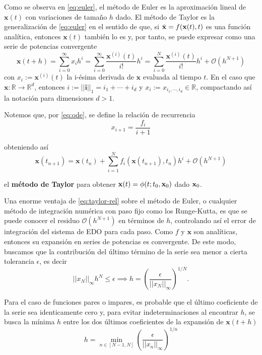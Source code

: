 Como se observa en \ref{eq:euler}, el método de Euler es la aproximación lineal de $\mathbf{x}(t)$ con variaciones de tamaño $h$ dado. El método de Taylor es la generalización de \ref{eq:euler} en el sentido de que, si $\dot{\mathbf{x}} = f(\mathbf{x}(t),t)$ es una función analítica, entonces $\mathbf{x}(t)$ también lo es y, por tanto, se puede expresar como una serie de potencias convergente 
\begin{equation}
\mathbf{x}(t + h) = \sum_{i=0}^\infty x_i h^i = \sum_{i=0}^\infty \frac{\mathbf{x}^{(i)}(t)}{i!}h^i 
= \sum_{i=0}^N \frac{\mathbf{x}^{(i)}(t)}{i!}h^i + \mathcal{O}(h^{N+1})
\label{eq:anal-exp}
\end{equation}
con $x_i := \mathbf{x}^{(i)}(t)$ la i-ésima derivada de $\mathbf{x}$ evaluada al tiempo $t$. En el caso que $\mathbf{x}: \mathbb{R} \to \mathbb{R}^d$, entonces $i := ||\mathbf{i}||_1 = i_1 + \cdots + i_d$ y $x_i := x_{i_1,\cdots,i_d} \in \mathbb{R}$, compactando así la notación para dimensiones $d > 1$.

Notemos que, por \ref{eq:ode}, se define la relación de recurrencia
\begin{equation}
x_{i+1} = \frac{f_i}{i+1}
\label{eq:rec-rel}
\end{equation}

obteniendo así 
\begin{equation}
\mathbf{x}(t_{n+1}) = \mathbf{x}(t_n) + \sum_{i=1}^N f_i(\mathbf{x}(t_{n+1}),t_n)h^i + \mathcal{O}(h^{N+1})
\label{eq:taylor-rel}
\end{equation}

el \textbf{método de Taylor} para obtener $\mathbf{x}(t) = \phi(t;t_0,\mathbf{x}_0)$ dado $\mathbf{x}_0$.

Una enorme ventaja de \ref{eq:taylor-rel} sobre el método de Euler, o cualquier método de integración numérica con paso fijo como los Runge-Kutta, es que se puede conocer el residuo $\mathcal{O}(h^{N+1})$ en términos de $h$, controlando así el error de integración del sistema de EDO para cada paso. Como $f$ y $\mathbf{x}$ son analíticas, entonces su expansión en series de potencias es convergente. De este modo, buscamos que la contribución del último término de la serie sea menor a cierta tolerancia $\epsilon$, es decir
\begin{equation*}
||x_N||_\infty h^N \leq \epsilon \implies h = \left( \frac{\epsilon}{||x_N||_\infty} \right)^{1/N}.
\end{equation*} 

Para el caso de funciones pares o impares, es probable que el último coeficiente de la serie sea identicamente cero y, para evitar indeterminaciones al encontrar $h$, se busca la mínima $h$ entre los dos últimos coeficientes de la expansión de $\mathbf{x}(t+h)$
\begin{equation}
h = \min_{n \in [N-1,N]}{ \left( \frac{\epsilon}{||x_n||_\infty} \right)^{1/n} }
\end{equation} 


